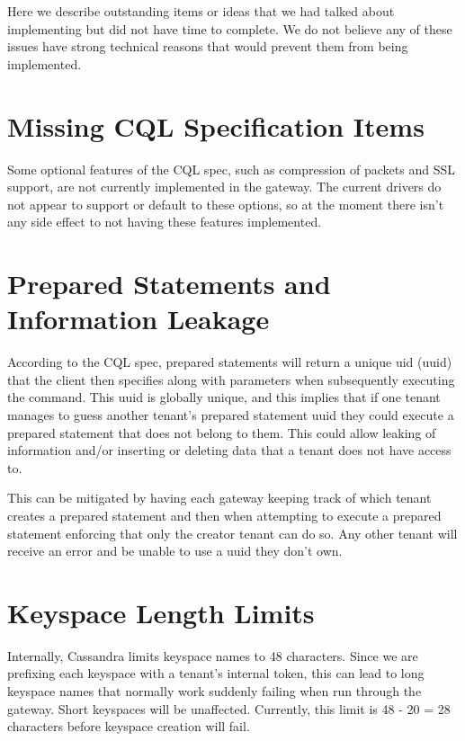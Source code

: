\documentclass[11pt,notitlepage]{report}
\begin{document}
Here we describe outstanding items or ideas that we had talked about implementing but did not have time to complete. We do not believe any of these issues have strong technical reasons that would prevent them from being implemented.

\section*{Missing CQL Specification Items}

Some optional features of the CQL spec, such as compression of packets and SSL support, are not currently implemented in the gateway. The current drivers do not appear to support or default to these options, so at the moment there isn't any side effect to not having these features implemented.


\section*{Prepared Statements and Information Leakage}

According to the CQL spec, prepared statements will return a unique uid (uuid) that the client then specifies along with parameters when subsequently executing the command. This uuid is globally unique, and this implies that if one tenant manages to guess another tenant's prepared statement uuid they could execute a prepared statement that does not belong to them. This could allow leaking of information and/or inserting or deleting data that a tenant does not have access to.

This can be mitigated by having each gateway keeping track of which tenant creates a prepared statement and then when attempting to execute a prepared statement enforcing that only the creator tenant can do so. Any other tenant will receive an error and be unable to use a uuid they don't own.


\section*{Keyspace Length Limits}

Internally, Cassandra limits keyspace names to 48 characters. Since we are prefixing each keyspace with a tenant's internal token, this can lead to long keyspace names that normally work suddenly failing when run through the gateway. Short keyspaces will be unaffected. Currently, this limit is 48 - 20 = 28 characters before keyspace creation will fail.
\end{document}

